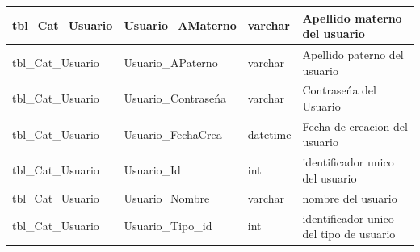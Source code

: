 \begin{longtable}[c]{|l|l|l|l|}
tbl\_Cat\_Usuario                                                                & Usuario\_AMaterno                                                                              & varchar                             & Apellido materno del usuario                                                                                                                      \\ \hline
tbl\_Cat\_Usuario                                                                & Usuario\_APaterno                                                                              & varchar                             & Apellido paterno del usuario                                                                                                                      \\ \hline
tbl\_Cat\_Usuario                                                                & Usuario\_Contraseńa                                                                            & varchar                             & Contraseńa del Usuario                                                                                                                            \\ \hline
tbl\_Cat\_Usuario                                                                & Usuario\_FechaCrea                                                                             & datetime                            & Fecha de creacion del usuario                                                                                                                     \\ \hline
tbl\_Cat\_Usuario                                                                & Usuario\_Id                                                                                    & int                                 & identificador unico del usuario                                                                                                                   \\ \hline
tbl\_Cat\_Usuario                                                                & Usuario\_Nombre                                                                                & varchar                             & nombre del usuario                                                                                                                                \\ \hline
tbl\_Cat\_Usuario                                                                & Usuario\_Tipo\_id                                                                              & int                                 & identificador unico del tipo de usuario                                                                                                           \\ \hline

\end{longtable}
